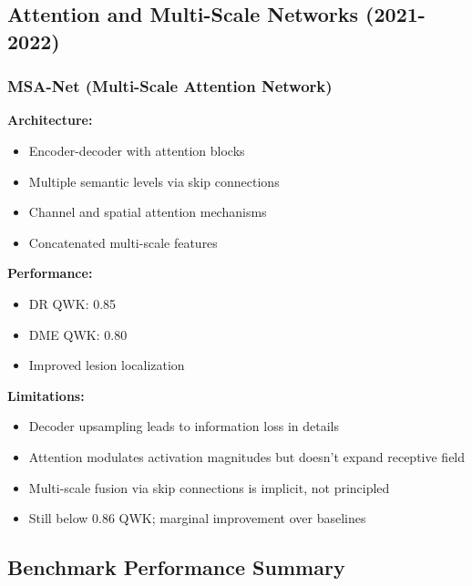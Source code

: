 \documentclass[12pt,a4paper]{article}
\begin{document}
\subsection{Attention and Multi-Scale Networks (2021-2022)}

\subsubsection{MSA-Net (Multi-Scale Attention Network)}

\textbf{Architecture:}
\begin{itemize}
    \item Encoder-decoder with attention blocks
    \item Multiple semantic levels via skip connections
    \item Channel and spatial attention mechanisms
    \item Concatenated multi-scale features
\end{itemize}

\textbf{Performance:}
\begin{itemize}
    \item DR QWK: 0.85
    \item DME QWK: 0.80
    \item Improved lesion localization
\end{itemize}

\textbf{Limitations:}
\begin{itemize}
    \item Decoder upsampling leads to information loss in details
    \item Attention modulates activation magnitudes but doesn't expand receptive field
    \item Multi-scale fusion via skip connections is implicit, not principled
    \item Still below 0.86 QWK; marginal improvement over baselines
\end{itemize}

\subsection{Benchmark Performance Summary}
\end{document}
